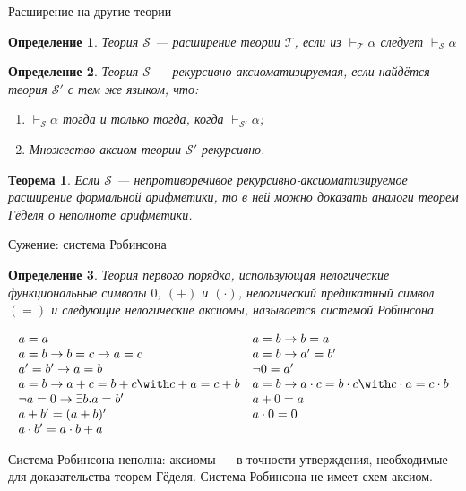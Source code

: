 \documentclass[aspectratio=169]{beamer}
\newtheorem{thm}{Теорема}[section]
\newtheorem{dfn}{Определение}[section]
\begin{document}
\begin{frame}{Расширение на другие теории}
\begin{dfn}Теория $\mathcal{S}$ --- расширение теории $\mathcal{T}$, если
из $\vdash_\mathcal{T} \alpha$ следует $\vdash_\mathcal{S} \alpha$\end{dfn}

\begin{dfn}Теория $\mathcal{S}$ --- рекурсивно-аксиоматизируемая, если найдётся теория $\mathcal{S'}$ с тем же языком, что:
\begin{enumerate}
\item $\vdash_\mathcal{S} \alpha$ тогда и только тогда, когда $\vdash_\mathcal{S'} \alpha$;
\item Множество аксиом теории $\mathcal{S'}$ рекурсивно.
\end{enumerate}
\end{dfn}

\begin{thm}Если $\mathcal{S}$ --- непротиворечивое рекурсивно-аксиоматизируемое расширение формальной арифметики, то
в ней можно доказать аналоги теорем Гёделя о неполноте арифметики.
\end{thm}
\end{frame}

\begin{frame}{Сужение: система Робинсона}
\begin{dfn}Теория первого порядка, использующая нелогические функциональные символы $0$, $(+)$ и $(\cdot)$, нелогический
предикатный символ $(=)$ и следующие нелогические аксиомы, называется системой Робинсона.

\vspace{-0.4cm}
$$\begin{array}{ll}
a = a & a = b \rightarrow b = a \\
a = b \rightarrow b = c \rightarrow a = c & a = b \rightarrow a' = b' \\
a' = b' \rightarrow a = b & \neg 0 = a' \\
a = b \rightarrow a + c = b + c \with c + a = c + b & a = b \rightarrow a \cdot c = b \cdot c \with c \cdot a = c \cdot b \\
\neg a = 0 \rightarrow \exists b. a = b' & a + 0 = a\\
a + b' = (a + b)' & a \cdot 0 = 0 \\
a \cdot b' = a \cdot b + a 
\end{array}$$
\end{dfn}

\vspace{-0.3cm}
Система Робинсона неполна: аксиомы --- в точности утверждения, необходимые для доказательства теорем Гёделя.
Система Робинсона не имеет схем аксиом.
\end{frame}
\end{document}
